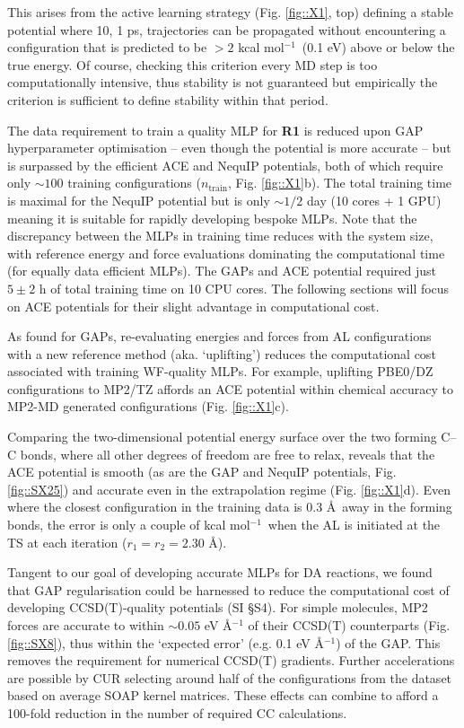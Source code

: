 \documentclass[twoside,twocolumn,9pt]{article}
\newcommand{\kcal}{kcal mol$^{-1}$}
\begin{document}
This arises from the active learning strategy (Fig. \ref{fig::X1}, top) defining a stable potential where 10, 1 ps, trajectories can be propagated without encountering a configuration that is predicted to be $>2$ \kcal~(0.1 eV) above or below the true energy. Of course, checking this criterion every MD step is too computationally intensive, thus stability is not guaranteed but empirically the criterion is sufficient to define stability within that period.


The data requirement to train a quality MLP for {\bfseries{R1}} is reduced upon GAP hyperparameter optimisation – even though the potential is more accurate – but is surpassed by the efficient ACE and NequIP potentials, both of which require only $\sim100$ training configurations ($n_\text{train}$, Fig. \ref{fig::X1}b). The total training time is maximal for the NequIP potential but is only $\sim1/2$ day (10 cores + 1 GPU) meaning it is suitable for rapidly developing bespoke MLPs. Note that the discrepancy between the MLPs in training time reduces with the system size, with reference energy and force evaluations dominating the computational time (for equally data efficient MLPs). The GAPs and ACE potential required just $5\pm2$ h of total training time on 10 CPU cores. The following sections will focus on ACE potentials for their slight advantage in computational cost.


As found for GAPs, re-evaluating energies and forces from AL configurations with a new reference method (aka. `uplifting’) reduces the computational cost associated with training WF-quality MLPs. For example, uplifting PBE0/DZ configurations to MP2/TZ affords an ACE potential within chemical accuracy to MP2-MD generated configurations (Fig. \ref{fig::X1}c).


Comparing the two-dimensional potential energy surface over the two forming C–C bonds, where all other degrees of freedom are free to relax, reveals that the ACE potential is smooth (as are the GAP and NequIP potentials, Fig. \ref{fig::SX25}) and accurate even in the extrapolation regime (Fig. \ref{fig::X1}d). Even where the closest configuration in the training data is 0.3 \AA~away in the forming bonds, the error is only a couple of \kcal~when the AL is initiated at the TS at each iteration ($r_1=r_2=2.30$ \AA).


Tangent to our goal of developing accurate MLPs for DA reactions, we found that GAP regularisation could be harnessed to reduce the computational cost of developing CCSD(T)-quality potentials (SI §S4). For simple molecules, MP2 forces are accurate to within $\sim0.05$ eV \AA${}^{-1}$ of their CCSD(T) counterparts (Fig. \ref{fig::SX8}), thus within the `expected error’ (e.g. 0.1 eV \AA${}^{-1}$) of the GAP. This removes the requirement for numerical CCSD(T) gradients. Further accelerations are possible by CUR\cite{Mahoney2009} selecting around half of the configurations from the dataset based on average SOAP kernel matrices. These effects can combine to afford a 100-fold reduction in the number of required CC calculations.
\end{document}
